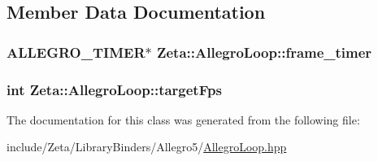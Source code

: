 \subsection{Member Data Documentation}
\hypertarget{classZeta_1_1AllegroLoop_ac1fae67baa5962de17573211a1a93e16}{
\subsubsection[{frame\+\_\+timer}]{\setlength{\rightskip}{0pt plus 5cm}A\+L\+L\+E\+G\+R\+O\+\_\+\+T\+I\+M\+E\+R$\ast$ Zeta\+::\+Allegro\+Loop\+::frame\+\_\+timer\hspace{0.3cm}{\ttfamily [private]}}}\label{classZeta_1_1AllegroLoop_ac1fae67baa5962de17573211a1a93e16}
\hypertarget{classZeta_1_1AllegroLoop_a0ee2957a3e13030b26e3c87aec68317f}{
\subsubsection[{target\+Fps}]{\setlength{\rightskip}{0pt plus 5cm}int Zeta\+::\+Allegro\+Loop\+::target\+Fps\hspace{0.3cm}{\ttfamily [private]}}}\label{classZeta_1_1AllegroLoop_a0ee2957a3e13030b26e3c87aec68317f}


The documentation for this class was generated from the following file\+:\begin{DoxyCompactItemize}
\item 
include/\+Zeta/\+Library\+Binders/\+Allegro5/\hyperlink{AllegroLoop_8hpp}{Allegro\+Loop.\+hpp}\end{DoxyCompactItemize}
